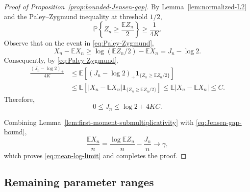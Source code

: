 \documentclass[12pt]{amsart}
\numberwithin{equation}{section}
\theoremstyle{plain}
\theoremstyle{definition}
\newcommand{\E}{\mathbb E}
\newcommand{\Pp}{\mathbb P}
\newcommand{\ind}{\mathbf 1}
\begin{document}
\begin{proof}[Proof of Proposition~\ref{prop:bounded-Jensen-gap}]
By Lemma~\ref{lem:normalized-L2} and the Paley--Zygmund inequality at
threshold $1/2$,
\begin{equation}
 \Pp\left\{Z_n\ge\frac{\E Z_n}{2}\right\}\ge\frac1{4K}.
 \label{eq:Paley-Zygmund}
\end{equation}
Observe that on the event in \eqref{eq:Paley-Zygmund},
\begin{equation}
 X_n-\E X_n\ge\log(\E Z_n/2)-\E X_n=J_n-\log2.
 \label{eq:jensen-event-comparison}
\end{equation}
Consequently, by \eqref{eq:Paley-Zygmund},
\[
\begin{aligned}
 \frac{(J_n-\log2)_+}{4K}
 &\le\E\left[(J_n-\log2)_+
   \ind_{\{Z_n\ge\E Z_n/2\}}\right]
 \\ &\le\E\left[|X_n-\E X_n|
   \ind_{\{Z_n\ge\E Z_n/2\}}\right]
 \le\E|X_n-\E X_n|\le C.
\end{aligned}
\]
Therefore,
\begin{equation}
 0\le J_n\le\log2+4KC.
 \label{eq:Jensen-gap-bound}
\end{equation}

Combining Lemma~\ref{lem:first-moment-submultiplicativity} with
\eqref{eq:Jensen-gap-bound},
\[
 \frac{\E X_n}{n}
 =\frac{\log\E Z_n}{n}-\frac{J_n}{n}
 \longrightarrow \gamma,
\]
which proves \eqref{eq:mean-log-limit} and completes the proof.
\end{proof}

\subsection{Remaining parameter ranges}
\label{sec:remaining-ranges}
\end{document}
